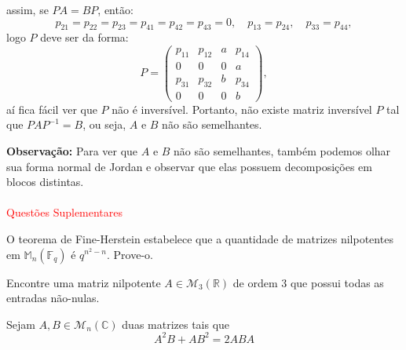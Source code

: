 \documentclass[11pt,a4paper]{article}
\begin{document}
assim, se $PA=BP$, então:
\[
p_{21}=p_{22}=p_{23}=p_{41}=p_{42}=p_{43}=0,\quad p_{13}=p_{24},\quad p_{33}=p_{44},
\]
logo $P$ deve ser da forma:
\[
P=\begin{pmatrix}
p_{11}&p_{12}&a&p_{14}\\
0&0&0&a\\
p_{31}&p_{32}&b&p_{34}\\
0&0&0&b
\end{pmatrix},
\]
aí fica fácil ver que $P$ não é inversível. Portanto, não existe matriz inversível $P$ tal que $PAP^{-1}=B$, ou seja, $A$ e $B$ não são semelhantes.

\bigskip
\noindent

\textbf{Observação:} Para ver que $A$ e $B$ não são semelhantes, também podemos olhar sua forma normal de Jordan e observar que elas possuem decomposições em blocos distintas.\\ \\
\textcolor{Red}{Questões Suplementares}

 O teorema de Fine-Herstein estabelece que a quantidade de matrizes nilpotentes em $\mathbb{M}_n(\mathbb{F}_q)$ é $q^{n^2 -n}.$ Prove-o. %
\solucao{}

 Encontre uma matriz nilpotente $A \in \mathcal{M}_3(\mathbb{R})$ de ordem $3$ que possui todas as entradas não-nulas.
\solucao{
        \[A = \begin{bmatrix}
         1 & 1 & 3\\
         5 & 2 & 6  \\
         -2 & -1 & -3 \\
         \end{bmatrix} \]
}

Sejam $A, B \in \mathcal{M}_n(\mathbb{C})$ duas matrizes tais que
\[
A^2B + AB^2 = 2ABA
\]
\solucao{
}
\end{document}

